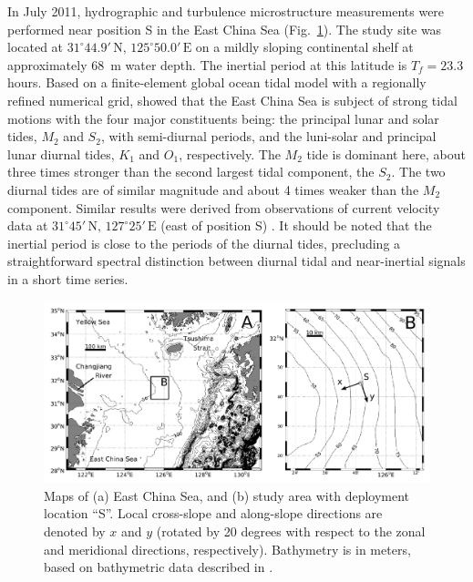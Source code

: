 In July 2011, hydrographic and turbulence microstructure measurements
were performed near position S in the East China Sea
(Fig.\ \ref{studysite}). The study site was located at $31^\circ
44.9'\,\text{N}, \, 125^\circ 50.0'\,\text{E}$ on a mildly sloping
continental shelf at approximately 68~m water depth. The inertial
period at this latitude is $T_f = 23.3$ hours. Based on a
finite-element global ocean tidal model with a regionally refined
numerical grid, \cite{Lefevreetal2000} showed that the East China Sea
is subject of strong tidal motions with the four major constituents
being: the principal lunar and solar tides, $M_2$ and $S_2$, with
semi-diurnal periods, and the luni-solar and principal lunar diurnal
tides, $K_1$ and $O_1$, respectively. The $M_2$ tide is dominant here,
about three times stronger than the second largest tidal component,
the $S_2$. The two diurnal tides are of similar magnitude and about 4
times weaker than the $M_2$ component. Similar results were derived from 
observations of current velocity data at  $31^\circ 45'\,\text{N}, \, 127^\circ 
25'\,\text{E}$ (east of position S) \citep[][]{Yoshikawaetal2012a}. It should 
be noted that the inertial period is close to the periods of the diurnal tides,
precluding a straightforward spectral distinction between diurnal
tidal and near-inertial signals in a short time series.

\begin{figure}
  \noindent\includegraphics[width=35pc]{studyside.pdf}
  \caption{Maps of (a) East China Sea, and (b) study area with
    deployment location ``S''. Local cross-slope and along-slope
    directions are denoted by $x$ and $y$ (rotated by 20 degrees with
    respect to the zonal and meridional directions,
    respectively). Bathymetry is in meters, based on bathymetric data
    described in \cite{Choietal2002a}.}
  \label{studysite}
\end{figure}

